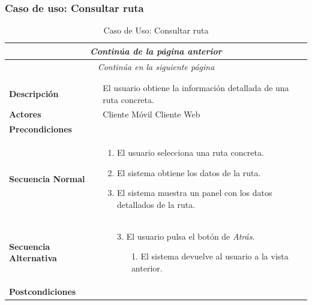 \newpage
\subsubsection*{Caso de uso: Consultar ruta}
\begin{longtable}{| p{4cm} | p{10cm} |}
\endfirsthead
\multicolumn{2}{c}{\textit{Continúa de la página anterior}}\\[12pt]
\hline
\endhead
\hline
\multicolumn{2}{c}{\textit{Continúa en la siguiente página}} \\
\endfoot
\hline
\caption{Caso de Uso: Consultar ruta}\label{fig:1}\\
\endlastfoot


\hline
\multicolumn{2}{|c|}{\textbf{CU$<$06$>$ - Consultar Ruta}} \\

\hline
\textbf{Descripción} &
El usuario obtiene la información detallada de una ruta concreta.\\

\hline
\textbf{Actores} &
Cliente Móvil\newline
Cliente Web\\

\hline
\textbf{Precondiciones} &
\\

\hline
\textbf{Secuencia Normal} &\mbox{}\par\vspace{-\baselineskip}
\begin{enumerate}[leftmargin=0.7cm, topsep=0.1cm]
\item El usuario selecciona una ruta concreta.
\item El sistema obtiene los datos de la ruta.
\item El sistema muestra un panel con los datos detallados de la ruta.
\end{enumerate}\\

\hline
\textbf{Secuencia Alternativa} &\mbox{}\par\vspace{-\baselineskip}
\begin{enumerate}[leftmargin=0.9cm, topsep=0.1cm]
\item[3.] El usuario pulsa el botón de \textit{Atrás}.
	\begin{itemize}
	\item[1.] El sistema devuelve al usuario a la vista anterior.
	\end{itemize}
\end{enumerate}
\\

\hline
\textbf{Postcondiciones} & 
\\
\hline
\end{longtable}



